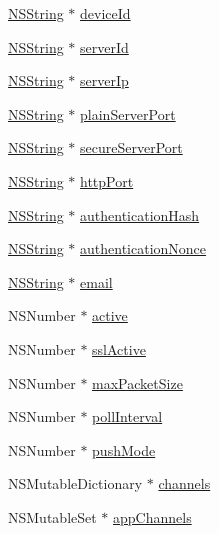 \begin{DoxyCompactItemize}
\item 
\hyperlink{class_n_s_string}{\-N\-S\-String} $\ast$ \hyperlink{interface_configuration_a5cdad07812622699acf6d5269279d6ee}{device\-Id}
\item 
\hyperlink{class_n_s_string}{\-N\-S\-String} $\ast$ \hyperlink{interface_configuration_ad0ebc152d01a04f7614a99bd21a5ff30}{server\-Id}
\item 
\hyperlink{class_n_s_string}{\-N\-S\-String} $\ast$ \hyperlink{interface_configuration_a55deb1b66cb33d0b1496856317859f09}{server\-Ip}
\item 
\hyperlink{class_n_s_string}{\-N\-S\-String} $\ast$ \hyperlink{interface_configuration_a0d39b490d3a26de60f5d0f73288c983e}{plain\-Server\-Port}
\item 
\hyperlink{class_n_s_string}{\-N\-S\-String} $\ast$ \hyperlink{interface_configuration_a9f6c8951287d30dbdbf11ebf35164cc7}{secure\-Server\-Port}
\item 
\hyperlink{class_n_s_string}{\-N\-S\-String} $\ast$ \hyperlink{interface_configuration_aba7ae65686a7d0251f7dbf717fd3b8a1}{http\-Port}
\item 
\hyperlink{class_n_s_string}{\-N\-S\-String} $\ast$ \hyperlink{interface_configuration_a5ecbb1cd4602effac37ff4e0cd541128}{authentication\-Hash}
\item 
\hyperlink{class_n_s_string}{\-N\-S\-String} $\ast$ \hyperlink{interface_configuration_a9d8bc45f27a900cacadd114ace33993c}{authentication\-Nonce}
\item 
\hyperlink{class_n_s_string}{\-N\-S\-String} $\ast$ \hyperlink{interface_configuration_ae4d52b4b96f3eb24c64c278a81195e5d}{email}
\item 
\-N\-S\-Number $\ast$ \hyperlink{interface_configuration_ac70e8b8f296c2a1980e2905f0b090f8c}{active}
\item 
\-N\-S\-Number $\ast$ \hyperlink{interface_configuration_a13631f1d7b87922819aaaf457aa004b5}{ssl\-Active}
\item 
\-N\-S\-Number $\ast$ \hyperlink{interface_configuration_a3663b860903a375dde1f331e06fa2700}{max\-Packet\-Size}
\item 
\-N\-S\-Number $\ast$ \hyperlink{interface_configuration_a40b7ff06c325a79d01a9c90d5f679a0b}{poll\-Interval}
\item 
\-N\-S\-Number $\ast$ \hyperlink{interface_configuration_a8c8d5a663a660ea7f8f330b918136190}{push\-Mode}
\item 
\-N\-S\-Mutable\-Dictionary $\ast$ \hyperlink{interface_configuration_ab9e05a79bd581c3e24503b8036c484e9}{channels}
\item 
\-N\-S\-Mutable\-Set $\ast$ \hyperlink{interface_configuration_a021ae22c9e69b44971b61e293b179c38}{app\-Channels}
\end{DoxyCompactItemize}


